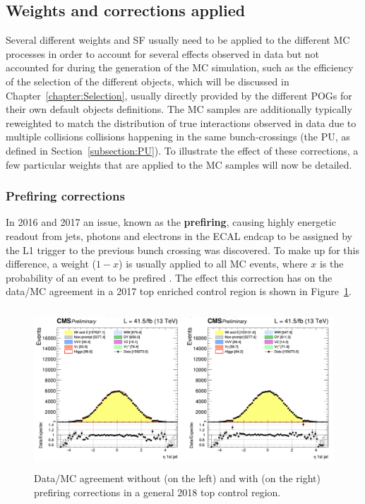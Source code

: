 \documentclass[a4paper, 10pt, openright]{report}
\begin{document}
\subsection{Weights and corrections applied} \label{subsection:Weights}

Several different weights and \ac{SF} usually need to be applied to the different \ac{MC} processes in order to account for several effects observed in data but not accounted for during the generation of the \ac{MC} simulation, such as the efficiency of the selection of the different objects, which will be discussed in Chapter~\ref{chapter:Selection}, usually directly provided by the different \acfp{POG} for their own default objects definitions. The \ac{MC} samples are additionally typically reweighted to match the distribution of true interactions observed in data due to multiple collisions collisions happening in the same bunch-crossings (the \ac{PU}, as defined in Section~\ref{subsection:PU}). To illustrate the effect of these corrections, a few particular weights that are applied to the \ac{MC} samples will now be detailed.

\subsubsection{Prefiring corrections}

In 2016 and 2017 an issue, known as the \textbf{prefiring}, causing highly energetic readout from jets, photons and electrons in the \ac{ECAL} endcap to be assigned by the \ac{L1} trigger to the previous bunch crossing was discovered. To make up for this difference, a weight ($1-x$) is usually applied to all \ac{MC} events, where $x$ is the probability of an event to be prefired \cite{Prefire}. The effect this correction has on the data/\ac{MC} agreement in a 2017 top enriched control region is shown in Figure~\ref{fig:Prefiring}.

\begin{figure}[htbp]
\begin{center}
\includegraphics[width=14cm, height=6cm]{figs/Prefiring.png}
\caption{Data/\ac{MC} agreement without (on the left) and with (on the right) prefiring corrections in a general 2018 top control region.}
\label{fig:Prefiring}
\end{center}
\end{figure}
\end{document}
